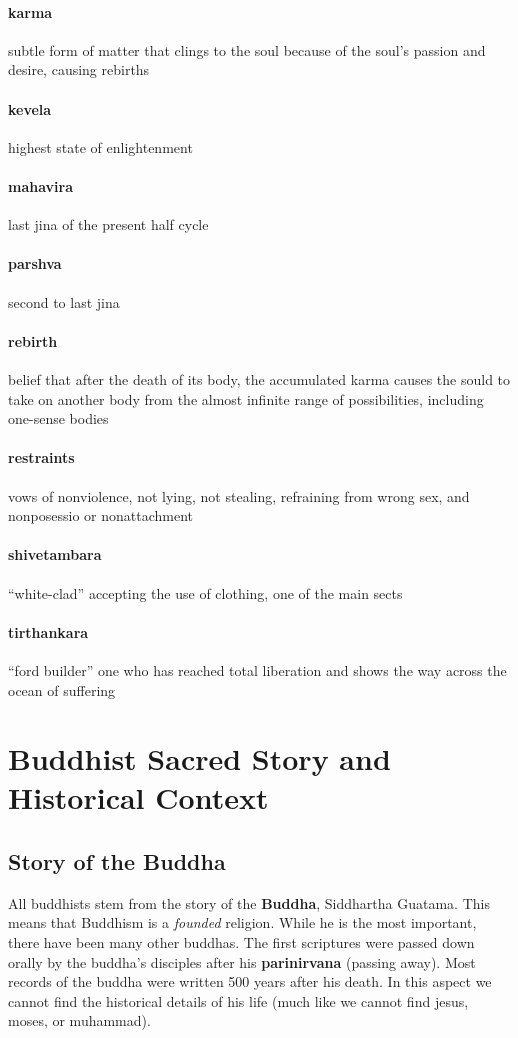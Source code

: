 \documentclass{article}
\begin{document}
\paragraph{karma}
\label{par:karma}
subtle form of matter that clings to the soul because of the soul's passion and desire, causing rebirths
\paragraph{kevela}
\label{par:kevela}
highest state of enlightenment
\paragraph{mahavira}
\label{par:mahavira}
last jina of the present half cycle
\paragraph{parshva}
\label{par:parshva}
second to last jina
\paragraph{rebirth}
\label{par:rebirth}
belief that after the death of its body, the accumulated karma causes the sould to take on another body from the almost infinite range of possibilities, including one-sense bodies
\paragraph{restraints}
\label{par:restraints}
vows of nonviolence, not lying, not stealing, refraining from wrong sex, and nonposessio or nonattachment
\paragraph{shivetambara}
\label{par:shivetambara}
``white-clad'' accepting the use of clothing, one of the main sects
\paragraph{tirthankara}
\label{par:tirthankara}
``ford builder'' one who has reached total liberation and shows the way across the ocean of suffering

\section*{Buddhist Sacred Story and Historical Context}
\label{sec:buddhist_sacred_story_and_historical_context}
\subsection*{Story of the Buddha}
\label{sub:story_of_the_buddha}
All buddhists stem from the story of the \textbf{Buddha}, Siddhartha Guatama. This means that Buddhism is a \emph{founded} religion. While he is the most important, there have been many other buddhas. The first scriptures were passed down orally by the buddha's disciples after his \textbf{parinirvana} (passing away). Most records of the buddha were written 500 years after his death. In this aspect we cannot find the historical details of his life (much like we cannot find jesus, moses, or muhammad).
\end{document}
